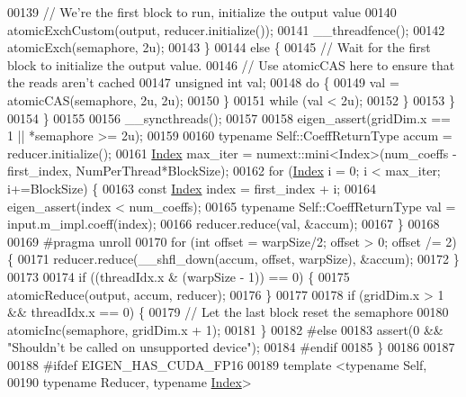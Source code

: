 \begin{DoxyCode}
00139         \textcolor{comment}{// We're the first block to run, initialize the output value}
00140         atomicExchCustom(output, reducer.initialize());
00141         \_\_threadfence();
00142         atomicExch(semaphore, 2u);
00143       \}
00144       \textcolor{keywordflow}{else} \{
00145         \textcolor{comment}{// Wait for the first block to initialize the output value.}
00146         \textcolor{comment}{// Use atomicCAS here to ensure that the reads aren't cached}
00147         \textcolor{keywordtype}{unsigned} \textcolor{keywordtype}{int} val;
00148         \textcolor{keywordflow}{do} \{
00149           val = atomicCAS(semaphore, 2u, 2u);
00150         \}
00151         \textcolor{keywordflow}{while} (val < 2u);
00152       \}
00153     \}
00154   \}
00155 
00156   \_\_syncthreads();
00157 
00158   eigen\_assert(gridDim.x == 1 || *semaphore >= 2u);
00159 
00160   \textcolor{keyword}{typename} Self::CoeffReturnType accum = reducer.initialize();
00161   \hyperlink{namespace_eigen_a62e77e0933482dafde8fe197d9a2cfde}{Index} max\_iter = numext::mini<Index>(num\_coeffs - first\_index, NumPerThread*BlockSize);
00162   \textcolor{keywordflow}{for} (\hyperlink{namespace_eigen_a62e77e0933482dafde8fe197d9a2cfde}{Index} i = 0; i < max\_iter; i+=BlockSize) \{
00163     \textcolor{keyword}{const} \hyperlink{namespace_eigen_a62e77e0933482dafde8fe197d9a2cfde}{Index} index = first\_index + i;
00164     eigen\_assert(index < num\_coeffs);
00165     \textcolor{keyword}{typename} Self::CoeffReturnType val = input.m\_impl.coeff(index);
00166     reducer.reduce(val, &accum);
00167   \}
00168 
00169 \textcolor{preprocessor}{#pragma unroll}
00170   \textcolor{keywordflow}{for} (\textcolor{keywordtype}{int} offset = warpSize/2; offset > 0; offset /= 2) \{
00171     reducer.reduce(\_\_shfl\_down(accum, offset, warpSize), &accum);
00172   \}
00173 
00174   \textcolor{keywordflow}{if} ((threadIdx.x & (warpSize - 1)) == 0) \{
00175     atomicReduce(output, accum, reducer);
00176   \}
00177 
00178   \textcolor{keywordflow}{if} (gridDim.x > 1 && threadIdx.x == 0) \{
00179     \textcolor{comment}{// Let the last block reset the semaphore}
00180     atomicInc(semaphore, gridDim.x + 1);
00181   \}
00182 \textcolor{preprocessor}{#else}
00183   assert(0 && \textcolor{stringliteral}{"Shouldn't be called on unsupported device"});
00184 \textcolor{preprocessor}{#endif}
00185 \}
00186 
00187 
00188 \textcolor{preprocessor}{#ifdef EIGEN\_HAS\_CUDA\_FP16}
00189 \textcolor{keyword}{template} <\textcolor{keyword}{typename} Self,
00190           \textcolor{keyword}{typename} Reducer, \textcolor{keyword}{typename} \hyperlink{namespace_eigen_a62e77e0933482dafde8fe197d9a2cfde}{Index}>

\end{DoxyCode}
